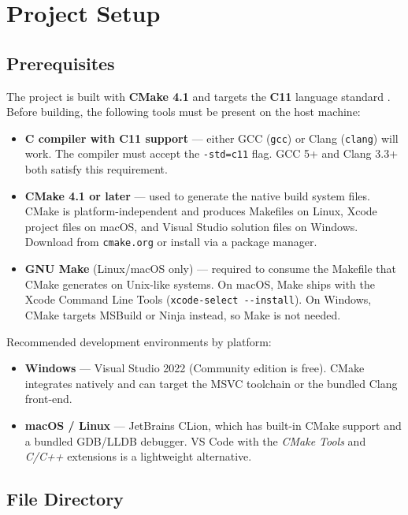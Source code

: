 \section{Project Setup}

\subsection{Prerequisites}

The project is built with \textbf{CMake 4.1} \cite{CMakeDocs} and targets the \textbf{C11} language standard \cite{C11Standard}. Before building, the following tools must be present on the host machine:

\begin{itemize}
    \item \textbf{C compiler with C11 support} — either GCC (\texttt{gcc}) or Clang (\texttt{clang}) will work. The compiler must accept the \texttt{-std=c11} flag. GCC 5+ and Clang 3.3+ both satisfy this requirement.
    \item \textbf{CMake 4.1 or later} — used to generate the native build system files. CMake is platform-independent and produces Makefiles on Linux, Xcode project files on macOS, and Visual Studio solution files on Windows. Download from \texttt{cmake.org} or install via a package manager.
    \item \textbf{GNU Make} (Linux/macOS only) — required to consume the Makefile that CMake generates on Unix-like systems. On macOS, Make ships with the Xcode Command Line Tools (\texttt{xcode-select -{}-install}). On Windows, CMake targets MSBuild or Ninja instead, so Make is not needed.
\end{itemize}

Recommended development environments by platform:

\begin{itemize}
    \item \textbf{Windows} — Visual Studio 2022 (Community edition is free). CMake integrates natively and can target the MSVC toolchain or the bundled Clang front-end.
    \item \textbf{macOS / Linux} — JetBrains CLion, which has built-in CMake support and a bundled GDB/LLDB debugger. VS Code with the \textit{CMake Tools} and \textit{C/C++} extensions is a lightweight alternative.
\end{itemize}

\subsection{File Directory}

